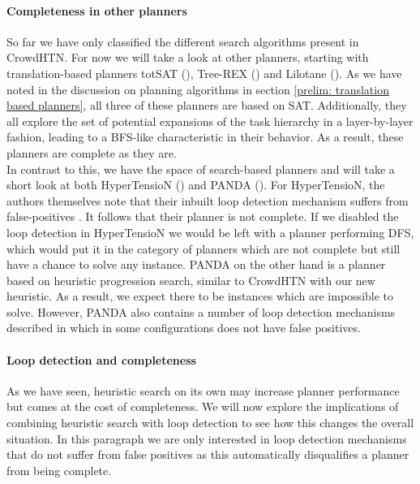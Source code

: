 \paragraph{Completeness in other planners}
So far we have only classified the different search algorithms present in CrowdHTN. For now we will take a look at other planners, starting with translation-based planners totSAT (\cite{behnke2018totsat}), Tree-REX (\cite{schreiber2019tree}) and Lilotane (\cite{schreiber2021lilotane}). As we have noted in the discussion on planning algorithms in section \ref{prelim: translation based planners}, all three of these planners are based on SAT. Additionally, they all explore the set of potential expansions of the task hierarchy in a layer-by-layer fashion, leading to a BFS-like characteristic in their behavior. As a result, these planners are complete as they are. \\
In contrast to this, we have the space of search-based planners and will take a short look at both HyperTensioN (\cite{magnaguagno2020hypertension}) and PANDA (\cite{holler2020htn}). For HyperTensioN, the authors themselves note that their inbuilt loop detection mechanism suffers from false-positives \cite{magnaguagno2020hypertension}. It follows that their planner is not complete. If we disabled the loop detection in HyperTensioN we would be left with a planner performing DFS, which would put it in the category of planners which are not complete but still have a chance to solve any instance. PANDA on the other hand is a planner based on heuristic progression search, similar to CrowdHTN with our new heuristic. As a result, we expect there to be instances which are impossible to solve. However, PANDA also contains a number of loop detection mechanisms described in \cite{holler2021loop} which in some configurations does not have false positives.

\paragraph{Loop detection and completeness}
As we have seen, heuristic search on its own may increase planner performance but comes at the cost of completeness. We will now explore the implications of combining heuristic search with loop detection to see how this changes the overall situation. In this paragraph we are only interested in loop detection mechanisms that do not suffer from false positives as this automatically disqualifies a planner from being complete. \\

